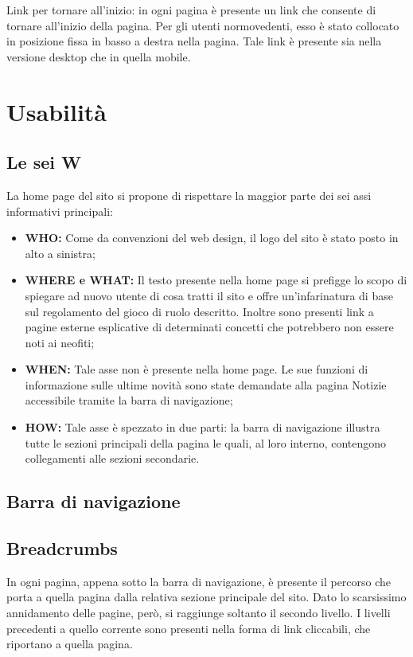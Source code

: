 \documentclass{article}
\begin{document}
		Link per tornare all'inizio: in ogni pagina è presente un link che consente di tornare all'inizio della pagina. Per gli utenti normovedenti, esso è stato collocato in posizione fissa in basso a destra nella pagina. Tale link è presente sia nella versione desktop che in quella mobile.


 \newpage

\section{Usabilità}

\subsection{Le sei W}
La home page del sito si propone di rispettare la maggior parte dei sei assi informativi principali:
\begin{itemize}
\item \textbf{WHO:} Come da convenzioni del web design, il logo del sito è stato posto in alto a sinistra;
\item \textbf{WHERE e WHAT:} Il testo presente nella home page si prefigge lo scopo di spiegare ad nuovo utente di cosa tratti il sito e offre un'infarinatura di base sul regolamento del gioco di ruolo descritto. Inoltre sono presenti link a pagine esterne esplicative di determinati concetti che potrebbero non essere noti ai neofiti;
\item \textbf{WHEN:} Tale asse non è presente nella home page. Le sue funzioni di informazione sulle ultime novità sono state demandate alla pagina Notizie accessibile tramite la barra di navigazione; 
\item \textbf{HOW:} Tale asse è spezzato in due parti: la barra di navigazione illustra tutte le sezioni principali della pagina le quali, al loro interno, contengono collegamenti alle sezioni secondarie.
\end{itemize}

\subsection{Barra di navigazione}

	
\subsection{Breadcrumbs}
In ogni pagina, appena sotto la barra di navigazione, è presente il percorso che porta a quella pagina dalla relativa sezione principale del sito. Dato lo scarsissimo annidamento delle pagine, però, si raggiunge soltanto il secondo livello. I livelli precedenti a quello corrente sono presenti nella forma di link cliccabili, che riportano a quella pagina.
\end{document}
